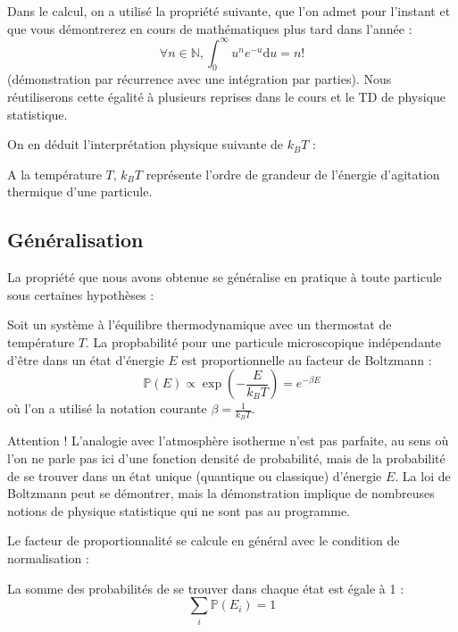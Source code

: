 \documentclass[11pt,fleqn]{book} %
\newcommand{\dd}{\mathrm{d}}
\begin{document}
\begin{remark}
	Dans le calcul, on a utilisé la propriété suivante, que l'on admet pour l'instant et que vous démontrerez en cours de mathématiques plus tard dans l'année :
	\begin{equation}
		\forall n \in \mathbb{N}, \int_0^\infty u^n e^{-u} \dd u = n!
	\end{equation}
	(démonstration par récurrence avec une intégration par parties). Nous réutiliserons cette égalité à plusieurs reprises dans le cours et le TD de physique statistique.
\end{remark}

On en déduit l'interprétation physique suivante de $k_B T$ :
\begin{proposition}
	A la température $T$, $k_B T$ représente l'ordre de grandeur de l'énergie d'agitation thermique d'une particule.
\end{proposition}

\subsection{Généralisation}

La propriété que nous avons obtenue se généralise en pratique à toute particule sous certaines hypothèses :
\begin{theorem}
	Soit un système à l'équilibre thermodynamique avec un thermostat de température $T$. La propbabilité pour une particule microscopique indépendante d'être dans un état d'énergie $E$ est proportionnelle au facteur de Boltzmann :
	\begin{equation}
		\mathbb{P}(E) \propto \exp\left(-\frac{E}{k_B T}\right) = e^{-\beta E}
	\end{equation}
	où l'on a utilisé la notation courante $\beta = \frac{1}{k_B T}$.
\end{theorem}
\begin{remark}
	Attention ! L'analogie avec l'atmosphère isotherme n'est pas parfaite, au sens où l'on ne parle pas ici d'une fonction densité de probabilité, mais de la probabilité de se trouver dans un état unique (quantique ou classique) d'énergie $E$. La loi de Boltzmann peut se démontrer, mais la démonstration implique de nombreuses notions de physique statistique qui ne sont pas au programme.
\end{remark}

Le facteur de proportionnalité se calcule en général avec le condition de normalisation :
\begin{proposition}
	La somme des probabilités de se trouver dans chaque état est égale à 1 :
	\begin{equation}
		\sum_i \mathbb{P}(E_i) = 1
	\end{equation}
\end{proposition}
\end{document}

